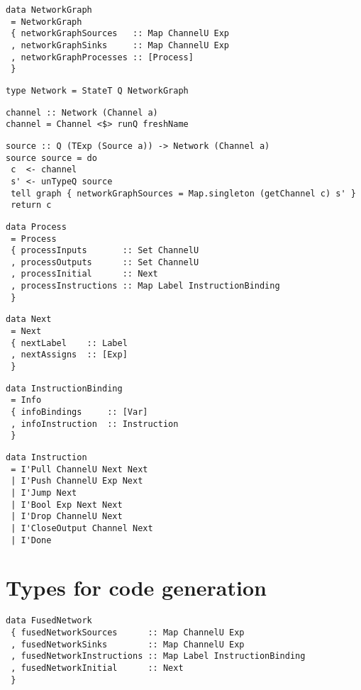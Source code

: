 \begin{lstlisting}
data NetworkGraph
 = NetworkGraph
 { networkGraphSources   :: Map ChannelU Exp
 , networkGraphSinks     :: Map ChannelU Exp
 , networkGraphProcesses :: [Process]
 }
\end{lstlisting}

\begin{lstlisting}
type Network = StateT Q NetworkGraph
\end{lstlisting}

\begin{lstlisting}
channel :: Network (Channel a)
channel = Channel <$> runQ freshName
\end{lstlisting}

\begin{lstlisting}
source :: Q (TExp (Source a)) -> Network (Channel a)
source source = do
 c  <- channel
 s' <- unTypeQ source
 tell graph { networkGraphSources = Map.singleton (getChannel c) s' }
 return c
\end{lstlisting}


\begin{lstlisting}
data Process
 = Process
 { processInputs       :: Set ChannelU
 , processOutputs      :: Set ChannelU
 , processInitial      :: Next
 , processInstructions :: Map Label InstructionBinding
 }
\end{lstlisting}

\begin{lstlisting}
data Next
 = Next
 { nextLabel    :: Label
 , nextAssigns  :: [Exp]
 }
\end{lstlisting}

\begin{lstlisting}
data InstructionBinding
 = Info
 { infoBindings     :: [Var]
 , infoInstruction  :: Instruction
 }
\end{lstlisting}

\begin{lstlisting}
data Instruction
 = I'Pull ChannelU Next Next
 | I'Push ChannelU Exp Next
 | I'Jump Next
 | I'Bool Exp Next Next
 | I'Drop ChannelU Next
 | I'CloseOutput Channel Next
 | I'Done
\end{lstlisting}

\section{Types for code generation}

\begin{lstlisting}
data FusedNetwork
 { fusedNetworkSources      :: Map ChannelU Exp
 , fusedNetworkSinks        :: Map ChannelU Exp
 , fusedNetworkInstructions :: Map Label InstructionBinding
 , fusedNetworkInitial      :: Next
 }
\end{lstlisting}

